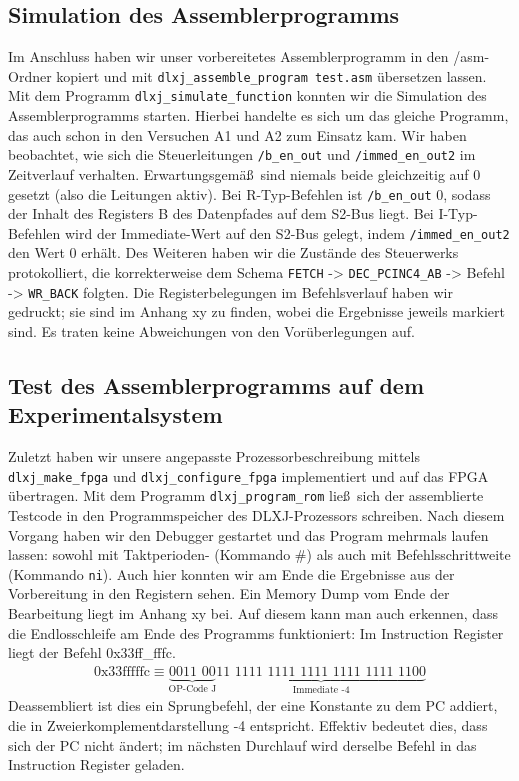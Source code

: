 \documentclass[12pt,a4paper]{scrartcl}
\begin{document}
\subsection*{Simulation des Assemblerprogramms}
Im Anschluss haben wir unser vorbereitetes Assemblerprogramm in den /asm-Ordner kopiert und mit \texttt{dlxj\_assemble\_program test.asm} \"ubersetzen lassen.
Mit dem Programm \texttt{dlxj\_simulate\_function} konnten wir die Simulation des Assemblerprogramms starten.
Hierbei handelte es sich um das gleiche Programm, das auch schon in den Versuchen A1 und A2 zum Einsatz kam.
Wir haben beobachtet, wie sich die Steuerleitungen \texttt{/b\_en\_out} und \texttt{/immed\_en\_out2} im Zeitverlauf verhalten.
Erwartungsgem\"a\ss\  sind niemals beide gleichzeitig auf 0 gesetzt (also die Leitungen aktiv).
Bei R-Typ-Befehlen ist \texttt{/b\_en\_out} 0, sodass der Inhalt des Registers B des Datenpfades auf dem S2-Bus liegt.
Bei I-Typ-Befehlen wird der Immediate-Wert auf den S2-Bus gelegt, indem \texttt{/immed\_en\_out2} den Wert 0 erh\"alt.
Des Weiteren haben wir die Zust\"ande des Steuerwerks protokolliert, die korrekterweise dem Schema \texttt{FETCH} -> \texttt{DEC\_PCINC4\_AB} -> Befehl -> \texttt{WR\_BACK} folgten.
Die Registerbelegungen im Befehlsverlauf haben wir gedruckt; sie sind im Anhang xy zu finden, wobei die Ergebnisse jeweils markiert sind.
Es traten keine Abweichungen von den Vor\"uberlegungen auf.

\subsection*{Test des Assemblerprogramms auf dem Experimentalsystem}
Zuletzt haben wir unsere angepasste Prozessorbeschreibung mittels \texttt{dlxj\_make\_fpga} und \texttt{dlxj\_configure\_fpga} implementiert und auf das FPGA \"ubertragen.
Mit dem Programm \texttt{dlxj\_program\_rom} lie\ss\  sich der assemblierte Testcode in den Programmspeicher des DLXJ-Prozessors schreiben.
Nach diesem Vorgang haben wir den Debugger gestartet und das Program mehrmals laufen lassen: sowohl mit Taktperioden- (Kommando \#) als auch mit Befehlsschrittweite (Kommando \texttt{ni}).
Auch hier konnten wir am Ende die Ergebnisse aus der Vorbereitung in den Registern sehen.
Ein Memory Dump vom Ende der Bearbeitung liegt im Anhang xy bei.
Auf diesem kann man auch erkennen, dass die Endlosschleife am Ende des Programms funktioniert:
Im Instruction Register liegt der Befehl 0x33ff\_fffc.
\begin{align*}
\text{0x33fffffc} \equiv \underbrace{\text{0011 00}}_{\text{OP-Code J}}\underbrace{\text{11 1111 1111 1111 1111 1111 1100}}_{\text{Immediate -4}}
\end{align*}
Deassembliert ist dies ein Sprungbefehl, der eine Konstante zu dem PC addiert, die in Zweierkomplementdarstellung -4 entspricht.
Effektiv bedeutet dies, dass sich der PC nicht \"andert; im n\"achsten Durchlauf wird derselbe Befehl in das Instruction Register geladen.
\end{document}
